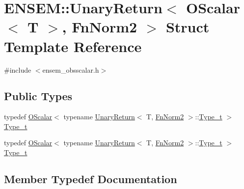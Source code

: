 \hypertarget{structENSEM_1_1UnaryReturn_3_01OScalar_3_01T_01_4_00_01FnNorm2_01_4}{}\section{E\+N\+S\+EM\+:\+:Unary\+Return$<$ O\+Scalar$<$ T $>$, Fn\+Norm2 $>$ Struct Template Reference}
\label{structENSEM_1_1UnaryReturn_3_01OScalar_3_01T_01_4_00_01FnNorm2_01_4}


{\ttfamily \#include $<$ensem\+\_\+obsscalar.\+h$>$}

\subsection*{Public Types}
\begin{DoxyCompactItemize}
\item 
typedef \mbox{\hyperlink{classENSEM_1_1OScalar}{O\+Scalar}}$<$ typename \mbox{\hyperlink{structENSEM_1_1UnaryReturn}{Unary\+Return}}$<$ T, \mbox{\hyperlink{structENSEM_1_1FnNorm2}{Fn\+Norm2}} $>$\+::\mbox{\hyperlink{structENSEM_1_1UnaryReturn_3_01OScalar_3_01T_01_4_00_01FnNorm2_01_4_ac5e99e6905d2033009638fb21f07f1be}{Type\+\_\+t}} $>$ \mbox{\hyperlink{structENSEM_1_1UnaryReturn_3_01OScalar_3_01T_01_4_00_01FnNorm2_01_4_ac5e99e6905d2033009638fb21f07f1be}{Type\+\_\+t}}
\item 
typedef \mbox{\hyperlink{classENSEM_1_1OScalar}{O\+Scalar}}$<$ typename \mbox{\hyperlink{structENSEM_1_1UnaryReturn}{Unary\+Return}}$<$ T, \mbox{\hyperlink{structENSEM_1_1FnNorm2}{Fn\+Norm2}} $>$\+::\mbox{\hyperlink{structENSEM_1_1UnaryReturn_3_01OScalar_3_01T_01_4_00_01FnNorm2_01_4_ac5e99e6905d2033009638fb21f07f1be}{Type\+\_\+t}} $>$ \mbox{\hyperlink{structENSEM_1_1UnaryReturn_3_01OScalar_3_01T_01_4_00_01FnNorm2_01_4_ac5e99e6905d2033009638fb21f07f1be}{Type\+\_\+t}}
\end{DoxyCompactItemize}


\subsection{Member Typedef Documentation}
\mbox{\label{structENSEM_1_1UnaryReturn_3_01OScalar_3_01T_01_4_00_01FnNorm2_01_4_ac5e99e6905d2033009638fb21f07f1be}} 
